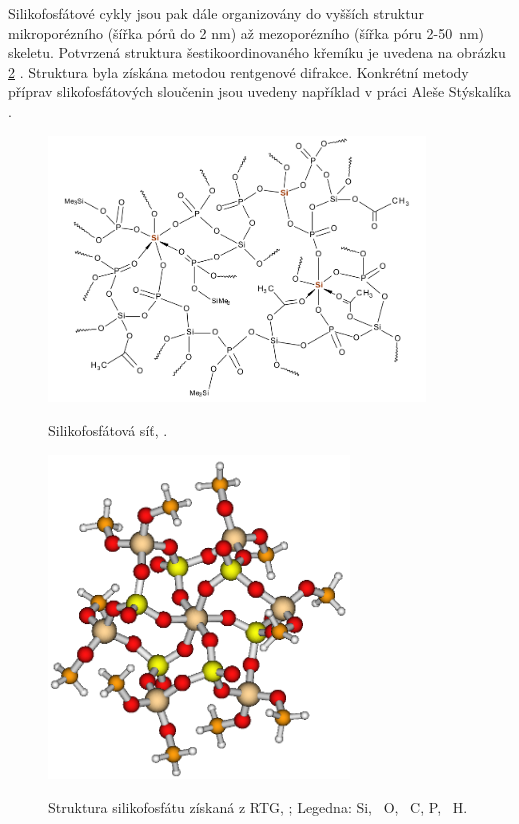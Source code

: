 \documentclass[
  digital, %
  table,   %
  lof,     %
  lot,     %
  oneside,
]{fithesis3}
\begin{document}
Silikofosfátové cykly jsou pak dále organizovány do vyšších struktur mikroporézního (šířka pórů do 2 nm) až mezoporézního (šířka póru 2-50~nm) skeletu. Potvrzená struktura šestikoordinovaného křemíku je uvedena na obrázku \ref{rtg_koordinace_sest} \cite{C3NJ00721A}. Struktura byla získána metodou rentgenové difrakce. Konkrétní metody příprav slikofosfátových sloučenin jsou uvedeny například v práci Aleše Stýskalíka \cite{Styskalik2015thesis}.

\begin{figure}
\caption{Silikofosfátová síť, \cite{Styskalik2015thesis}.}\includegraphics[width=10cm]{si_polymer_cely.png}
\label{si_polymer_cely}\end{figure}

\begin{figure}
\caption{Struktura silikofosfátu získaná z RTG, \cite{C4TA06823H};  Legedna:  Si, ~O, ~C,  P, ~H. }
\center \includegraphics[width=8cm]{struktura_puvodni.png} \label{rtg_koordinace_sest} \end{figure}
\end{document}
